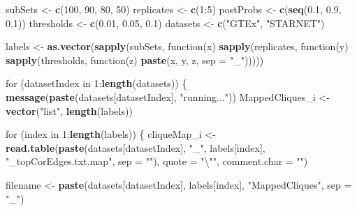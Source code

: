 \documentclass[]{article}
\newenvironment{Shaded}{\begin{snugshade}}{\end{snugshade}}
\newcommand{\KeywordTok}[1]{\textcolor[rgb]{0.13,0.29,0.53}{\textbf{{#1}}}}
\newcommand{\DataTypeTok}[1]{\textcolor[rgb]{0.13,0.29,0.53}{{#1}}}
\newcommand{\DecValTok}[1]{\textcolor[rgb]{0.00,0.00,0.81}{{#1}}}
\newcommand{\FloatTok}[1]{\textcolor[rgb]{0.00,0.00,0.81}{{#1}}}
\newcommand{\CharTok}[1]{\textcolor[rgb]{0.31,0.60,0.02}{{#1}}}
\newcommand{\StringTok}[1]{\textcolor[rgb]{0.31,0.60,0.02}{{#1}}}
\newcommand{\NormalTok}[1]{{#1}}
\begin{document}
\begin{Shaded}
\begin{Highlighting}[]
\NormalTok{subSets <-}\StringTok{ }\KeywordTok{c}\NormalTok{(}\DecValTok{100}\NormalTok{, }\DecValTok{90}\NormalTok{, }\DecValTok{80}\NormalTok{, }\DecValTok{50}\NormalTok{)}
\NormalTok{replicates <-}\StringTok{ }\KeywordTok{c}\NormalTok{(}\DecValTok{1}\NormalTok{:}\DecValTok{5}\NormalTok{)}
\NormalTok{postProbs <-}\StringTok{ }\KeywordTok{c}\NormalTok{(}\KeywordTok{seq}\NormalTok{(}\FloatTok{0.1}\NormalTok{, }\FloatTok{0.9}\NormalTok{, }\FloatTok{0.1}\NormalTok{))}
\NormalTok{thresholds <-}\StringTok{ }\KeywordTok{c}\NormalTok{(}\FloatTok{0.01}\NormalTok{, }\FloatTok{0.05}\NormalTok{, }\FloatTok{0.1}\NormalTok{)}
\NormalTok{datasets <-}\StringTok{ }\KeywordTok{c}\NormalTok{(}\StringTok{"GTEx"}\NormalTok{, }\StringTok{"STARNET"}\NormalTok{)}

\NormalTok{labels <-}\StringTok{ }\KeywordTok{as.vector}\NormalTok{(}\KeywordTok{sapply}\NormalTok{(subSets, function(x) }\KeywordTok{sapply}\NormalTok{(replicates, }
    \NormalTok{function(y) }\KeywordTok{sapply}\NormalTok{(thresholds, function(z) }\KeywordTok{paste}\NormalTok{(x, y, z, }
        \DataTypeTok{sep =} \StringTok{"_"}\NormalTok{)))))}

\NormalTok{for (datasetIndex in }\DecValTok{1}\NormalTok{:}\KeywordTok{length}\NormalTok{(datasets)) \{}
    \KeywordTok{message}\NormalTok{(}\KeywordTok{paste}\NormalTok{(datasets[datasetIndex], }\StringTok{"running..."}\NormalTok{))}
    \NormalTok{MappedCliques_i <-}\StringTok{ }\KeywordTok{vector}\NormalTok{(}\StringTok{"list"}\NormalTok{, }\KeywordTok{length}\NormalTok{(labels))}
    
    \NormalTok{for (index in }\DecValTok{1}\NormalTok{:}\KeywordTok{length}\NormalTok{(labels)) \{}
        \NormalTok{cliqueMap_i <-}\StringTok{ }\KeywordTok{read.table}\NormalTok{(}\KeywordTok{paste}\NormalTok{(datasets[datasetIndex], }
            \StringTok{"_"}\NormalTok{, labels[index], }\StringTok{"_topCorEdges.txt.map"}\NormalTok{, }\DataTypeTok{sep =} \StringTok{""}\NormalTok{), }
            \DataTypeTok{quote =} \StringTok{"}\CharTok{\textbackslash{}"}\StringTok{"}\NormalTok{, }\DataTypeTok{comment.char =} \StringTok{""}\NormalTok{)}
        
        \NormalTok{filename <-}\StringTok{ }\KeywordTok{paste}\NormalTok{(datasets[datasetIndex], labels[index], }
            \StringTok{"MappedCliques"}\NormalTok{, }\DataTypeTok{sep =} \StringTok{"_"}\NormalTok{)}
        

\end{Highlighting}
\end{Shaded}
\end{document}
